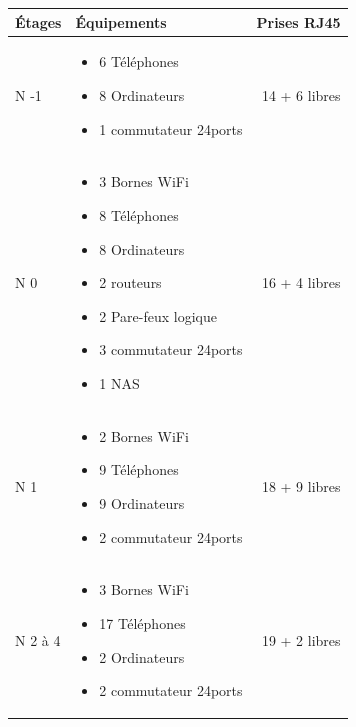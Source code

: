     \begin{center}
        \begin{tabular}{|l|p{10cm}|r|}
          \hline
            Étages  &   Équipements    &   Prises RJ45 \\
          \hline
            N -1    &
            \begin{itemize}
                \item 6 Téléphones
                \item 8 Ordinateurs
                \item 1 commutateur 24ports
            \end{itemize}
            &   14 + 6 libres \\
          \hline
            N 0    &
            \begin{itemize}
                \item 3 Bornes WiFi
                \item 8 Téléphones
                \item 8 Ordinateurs
                \item 2 routeurs
                \item 2 Pare-feux logique
                \item 3 commutateur 24ports
                \item 1 NAS
            \end{itemize}
            &   16 + 4 libres \\
          \hline
            N 1    &
            \begin{itemize}
                \item 2 Bornes WiFi
                \item 9 Téléphones
                \item 9 Ordinateurs
                \item 2 commutateur 24ports
            \end{itemize}
            &   18 + 9 libres \\
          \hline
            N 2 à 4    &
            \begin{itemize}
                \item 3 Bornes WiFi
                \item 17 Téléphones
                \item 2 Ordinateurs
                \item 2 commutateur 24ports
            \end{itemize}
            &   19 + 2 libres \\
          \hline
        \end{tabular}
    \end{center}

